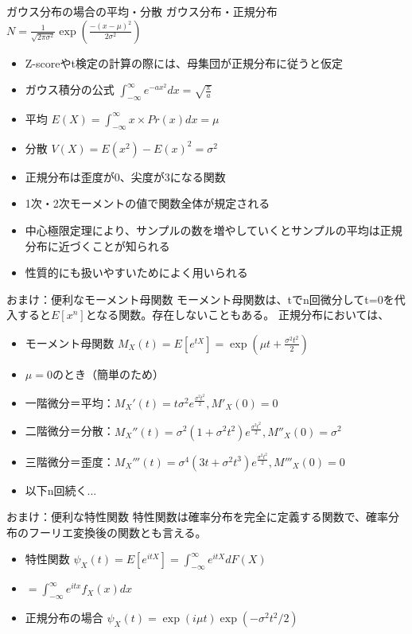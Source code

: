 \documentclass[cjk, aspectratio=169]{beamer}
\begin{document}
\begin{frame}{ガウス分布の場合の平均・分散}
ガウス分布・正規分布 $N=\frac{1}{\sqrt{2\pi \sigma^2}}\exp\left(\frac{-(x-\mu)^2}{2\sigma^2}\right)$
\begin{itemize}
\item Z-scoreやt検定の計算の際には、母集団が正規分布に従うと仮定
\item ガウス積分の公式 $\int_{-\infty}^{\infty}e^{-ax^2}dx = \sqrt{\frac{\pi}{a}}$
\item 平均 $E(X) = \int_{-\infty}^{\infty} x \times Pr(x) dx = \mu$ 
\item 分散 $V(X) = E(x^2)-E(x)^2 = \sigma^2$
\item 正規分布は歪度が0、尖度が3になる関数
\item 1次・2次モーメントの値で関数全体が規定される
\item 中心極限定理により、サンプルの数を増やしていくとサンプルの平均は正規分布に近づくことが知られる
\item 性質的にも扱いやすいためによく用いられる
\end{itemize}
\end{frame}

\begin{frame}{おまけ：便利なモーメント母関数}
モーメント母関数は、tでn回微分してt=0を代入すると$E[x^n]$となる関数。存在しないこともある。
正規分布においては、
\begin{itemize}
\item モーメント母関数 $M_{X}(t) = E[e^{tX}] = \exp \left( \mu t + \frac{\sigma^2t^2}{2} \right)$
\item $\mu = 0$のとき（簡単のため）
\item 一階微分＝平均：$M_{X}'(t)=t\sigma^2 e^{\frac{\sigma^2 t^2}{2}}, M'_{X}(0) = 0$
\item 二階微分＝分散：$M_{X}''(t)=\sigma^2(1 + \sigma^2 t^2)e^{\frac{\sigma^2 t^2}{2}}, M''_{X}(0)=\sigma^2 $
\item 三階微分＝歪度：$M_{X}'''(t)=\sigma^4 (3t + \sigma^2t^3) e^{\frac{\sigma^2 t^2}{2}}, M'''_{X}(0) = 0  $
\item 以下n回続く...
\end{itemize}
\end{frame}

\begin{frame}{おまけ：便利な特性関数}
特性関数は確率分布を完全に定義する関数で、確率分布のフーリエ変換後の関数とも言える。
\begin{itemize}
\item 特性関数 $\psi_X(t) = E[e^{itX}] = \int_{-\infty}^{\infty} e^{itX} dF(X) $
\item $= \int_{-\infty}^{\infty} e^{itx}f_X(x) dx $
\item 正規分布の場合 $\psi_X(t) = \exp \left(i\mu t\right) \exp \left(-\sigma^2t^2/2\right)$
\end{itemize}
\end{frame}
\end{document}
